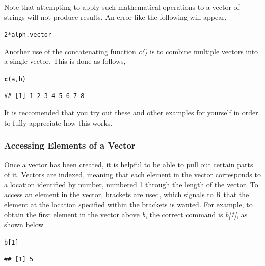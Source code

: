 \documentclass{report}\usepackage[]{graphicx}\usepackage[]{color}
\makeatletter
\newcommand{\hlnum}[1]{\textcolor[rgb]{0.686,0.059,0.569}{#1}}%
\newcommand{\hlopt}[1]{\textcolor[rgb]{0,0,0}{#1}}%
\newcommand{\hlstd}[1]{\textcolor[rgb]{0.345,0.345,0.345}{#1}}%
\newcommand{\hlkwd}[1]{\textcolor[rgb]{0.737,0.353,0.396}{\textbf{#1}}}%
\newenvironment{kframe}{%
 \def\at@end@of@kframe{}%
 \ifinner\ifhmode%
  \def\at@end@of@kframe{\end{minipage}}%
  \begin{minipage}{\columnwidth}%
 \fi\fi%
 \def\FrameCommand##1{\hskip\@totalleftmargin \hskip-\fboxsep
 \colorbox{shadecolor}{##1}\hskip-\fboxsep
     \hskip-\linewidth \hskip-\@totalleftmargin \hskip\columnwidth}%
 \MakeFramed {\advance\hsize-\width
   \@totalleftmargin\z@ \linewidth\hsize
   \@setminipage}}%
 {\par\unskip\endMakeFramed%
 \at@end@of@kframe}
\newenvironment{knitrout}{}{} %
\makeatother
\begin{document}
Note that attempting to apply such mathematical operations to a vector of strings will not produce results.  An error like the following will appear, 
\begin{knitrout}
\color{fgcolor}\begin{kframe}
\begin{alltt}
\hlnum{2}\hlopt{*}\hlstd{alph.vector}
\end{alltt}


{\ttfamily\noindent\bfseries\color{errorcolor}{\#\# Error in 2 * alph.vector: non-numeric argument to binary operator}}\end{kframe}
\end{knitrout}

Another use of the concatenating function \textit{c()} is to combine multiple vectors into a single vector.  This is done as follows, 
\begin{knitrout}
\color{fgcolor}\begin{kframe}
\begin{alltt}
\hlkwd{c}\hlstd{(a,b)}
\end{alltt}
\begin{verbatim}
## [1] 1 2 3 4 5 6 7 8
\end{verbatim}
\end{kframe}
\end{knitrout}

It is reccomended that you try out these and other examples for yourself in order to fully appreciate how this works.

\subsubsection{Accessing Elements of a Vector} \label{access_vectors}
Once a vector has been created, it is helpful to be able to pull out certain parts of it.  Vectors are indexed, meaning that each element in the vector corresponds to a location identified by number, numbered 1 through the length of the vector.  To access an element in the vector, brackets are used, which signals to \textsf{R} that the element at the location specified within the brackets is wanted.  For example, to obtain the first element in the vector above \textit{b}, the correct command is \textit{b[1]}, as shown below 
\begin{knitrout}
\color{fgcolor}\begin{kframe}
\begin{alltt}
\hlstd{b[}\hlnum{1}\hlstd{]}
\end{alltt}
\begin{verbatim}
## [1] 5
\end{verbatim}
\end{kframe}
\end{knitrout}
\end{document}
